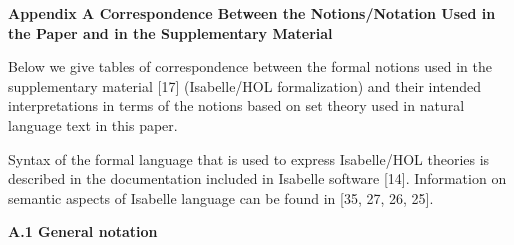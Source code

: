  
 
 


 
\par\medskip\noindent\textbf{Appendix A Correspondence Between the Notions/Notation Used in the Paper and in the Supplementary Material}\par
 
 
Below we give tables of correspondence between the formal notions used in the supplementary material [17] (Isabelle/HOL formalization) and their intended interpretations in terms of the notions based on set theory used in natural language text in this paper.\par
 
 
 
Syntax of the formal language that is used to express Isabelle/HOL theories is described in the documentation included in Isabelle software [14]. Information on semantic aspects of Isabelle language can be found in [35, 27, 26, 25].\par
 
 
 
\par\medskip\noindent\textbf{A.1 General notation}\par
 
 
